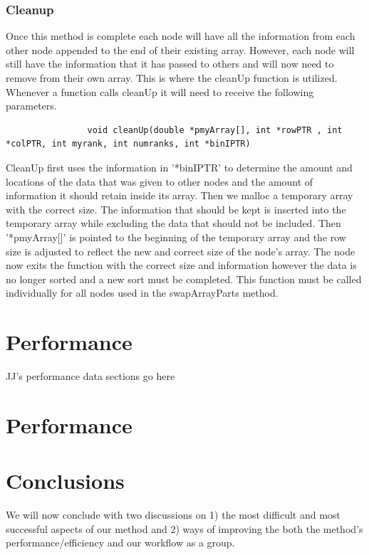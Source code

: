 \documentclass{article}
\begin{document}
\subsubsection{Cleanup}
Once this method is complete each node will have all the information from each other node appended to the end of their existing array. However, each node will still have the information that it has passed to others and will now need to remove from their own array. This is where the cleanUp function is utilized. Whenever a function calls cleanUp it will need to receive the following parameters.
\begin{lstlisting}
                void cleanUp(double *pmyArray[], int *rowPTR , int *colPTR, int myrank, int numranks, int *binIPTR)
\end{lstlisting}
CleanUp first uses the information in '*binIPTR' to determine the amount and locations of the data that was given to other nodes and the amount of information it should retain inside its array. Then we malloc a temporary array with the correct size. The information that should be kept is inserted into the temporary array while excluding the data that should not be included. Then '*pmyArray[]' is pointed to the beginning of the temporary array and the row size is adjusted to reflect the new and correct size of the node's array. The node now exits the function with the correct size and information however the data is no longer sorted and a new sort must be completed. This function must be called individually for all nodes used in the swapArrayParts method. 


\section{Performance}

JJ's performance data sections go here

\section{Performance}




\section{Conclusions}

We will now conclude with two discussions on 1) the most difficult and most successful aspects of our method and 2) ways of improving the both the method's performance/efficiency and our workflow as a group.
\end{document}
